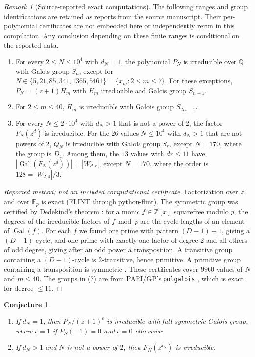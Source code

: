 \documentclass[11pt,a4paper]{article}
\newtheorem{conjecture}[theorem]{Conjecture}
\theoremstyle{definition}
\theoremstyle{remark}
\newtheorem{remark}[theorem]{Remark}
\numberwithin{equation}{section}
\begin{document}
\begin{remark}[Source-reported exact computations]\label{B:C:thm-galcomp}
The following ranges and group identifications are retained as reports from
the source manuscript. Their per-polynomial certificates are not embedded
here or independently rerun in this compilation. Any conclusion depending
on these finite ranges is conditional on the reported data.
\leavevmode
\begin{enumerate}
\item For every $2\le N\le10^4$ with $d_N=1$, the polynomial $P_N$ is
irreducible over $\mathbb Q$ with Galois group $S_n$, except for
$N\in\{5,21,85,341,1365,5461\}=\{x_m:2\le m\le7\}$.  For these exceptions,
$P_N=(z+1)H_m$ with $H_m$ irreducible and Galois group $S_{n-1}$.
\item For $2\le m\le40$, $H_m$ is irreducible with Galois group $S_{2m-1}$.
\item For every $N\le2\cdot10^4$ with $d_N>1$ that is not a power of $2$, the
factor $F_N(z^d)$ is irreducible.  For the $26$ values $N\le10^4$ with $d_N>1$ that are not powers of
$2$, $Q_N$ is irreducible with Galois group $S_r$, except $N=170$, where the
group is $D_4$.  Among them, the $13$ values with $dr\le11$ have
$|\operatorname{Gal}(F_N(z^d))|=|W_{d,r}|$, except $N=170$, where the order is
$128=|W_{2,4}|/3$.
\end{enumerate}
\end{remark}

\begin{proof}[Reported method; not an included computational certificate]
Factorization over $\mathbb Z$ and over $\mathbb F_p$ is exact (FLINT \cite{R039}
through python-flint).  The
symmetric group was certified by Dedekind's theorem \cite{R035}: for a monic
$f\in\mathbb Z[x]$ squarefree modulo $p$, the degrees of the irreducible factors
of $f\bmod p$ are the cycle lengths of an element of $\operatorname{Gal}(f)$.
For each $f$ we found one prime with pattern $(D-1)+1$, giving a $(D-1)$-cycle,
and one prime with exactly one factor of degree $2$ and all others of odd degree,
giving after an odd power a transposition.  A transitive group containing a
$(D-1)$-cycle is $2$-transitive, hence primitive.  A primitive group containing a
transposition is symmetric \cite{R036}.  These certificates cover $9960$
values of $N$ and $m\le40$.  The groups in (3) are from PARI/GP's
\texttt{polgalois} \cite{R037}, which is exact for degree $\le11$.
\end{proof}

\begin{conjecture}\label{B:C:conj-gal}
\leavevmode
\begin{enumerate}
\item If $d_N=1$, then $P_N/(z+1)^{\epsilon}$ is irreducible with full symmetric
Galois group, where $\epsilon=1$ if $P_N(-1)=0$ and $\epsilon=0$ otherwise.
\item If $d_N>1$ and $N$ is not a power of $2$, then $F_N(z^{d_N})$ is irreducible.
\end{enumerate}
\end{conjecture}
\end{document}
